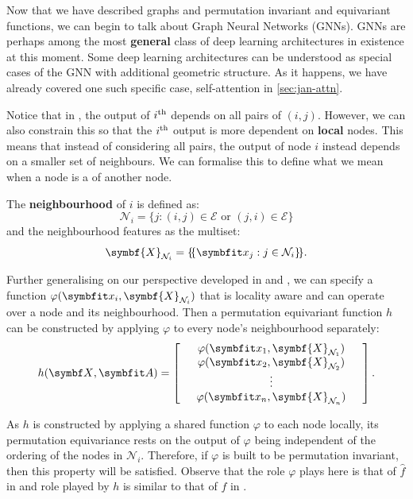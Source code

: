 Now that we have described graphs and permutation invariant and equivariant functions, we can begin to talk about Graph Neural Networks (GNNs). GNNs are perhaps among the most \textbf{general} class of deep learning architectures in existence at this moment. Some deep learning architectures can be understood as special cases of the GNN with additional geometric structure. As it happens, we have already covered one such specific case, self-attention in \cref{sec:jan-attn}.

Notice that in , the output of $i\textsuperscript{th}$ depends on all pairs of $(i, j)$. However, we can also constrain this so that the $i\textsuperscript{th}$ output is more dependent on \textbf{local} nodes. This means that instead of considering all pairs, the output of node $i$ instead depends on a smaller set of neighbours. We can formalise this to define what we mean when a node is a   of another node.

The \textbf{neighbourhood} of $i$ is defined as:
\begin{equation}
\mathcal{N}_{i}=\{j:(i, j) \in \mathcal{E} \text { or }(j, i) \in \mathcal{E}\}
\end{equation}
and the neighbourhood features as the multiset:
\begin{equation}
\symbf{X}_{\mathcal{N}_{i}}=\ldblbrace\bfitx_{j}: j \in \mathcal{N}_{i}\rdblbrace .
\end{equation}

Further generalising on our perspective developed in  and , we can specify a function $\varphi(\bfitx_i, \symbf{X}_{\mathcal{N}_{i}})$ that is locality aware and can operate over a node and its neighbourhood. Then a permutation equivariant function $h$ can be constructed by applying $\varphi$ to every node's neighbourhood separately:
\begin{equation}
    h({\symbf X}, {\symbfit A}) =
\left[
  \begin{array}{ccc}
     & \varphi(\bfitx_1, \symbf{X}_{\mathcal{N}_1}) &  \\
     & \varphi(\bfitx_2, \symbf{X}_{\mathcal{N}_2}) &  \\
             & \vdots    &          \\
     & \varphi(\bfitx_n, \symbf{X}_{\mathcal{N}_n}) & 
  \end{array}
\right].
\label{eq:graph_equivariant}
\end{equation}

As $h$ is constructed by applying a shared function $\varphi$ to each node locally, its permutation equivariance rests on the output of $\varphi$ being independent of the ordering of the nodes in $\mathcal{N}_i$. Therefore, if $\varphi$ is built to be permutation invariant, then this property will be satisfied. Observe that the role $\varphi$ plays here is that of $\widehat{f}$ in  and role played by $h$ is similar to that of $f$ in .

